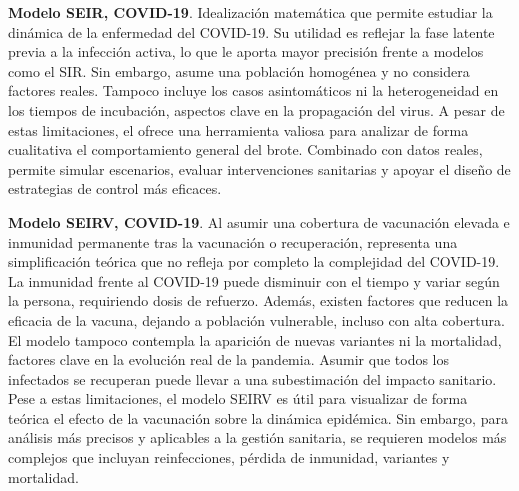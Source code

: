 \vspace{2em}
\textbf{Modelo SEIR, COVID-19}. Idealización matemática que permite estudiar la dinámica de la enfermedad del COVID-19. Su utilidad es reflejar la fase latente previa a la infección activa, lo que le aporta mayor precisión frente a modelos como el SIR.
Sin embargo, asume una población homogénea y no considera factores reales. Tampoco incluye los casos asintomáticos ni la heterogeneidad en los tiempos de incubación, aspectos clave en la propagación del virus.
A pesar de estas limitaciones, el ofrece una herramienta valiosa para analizar de forma cualitativa el comportamiento general del brote. Combinado con datos reales, permite simular escenarios, evaluar intervenciones sanitarias y apoyar el diseño de estrategias de control más eficaces.

\vspace{2em}

\textbf{Modelo SEIRV, COVID-19}. Al asumir una cobertura de vacunación elevada e inmunidad permanente tras la vacunación o recuperación, representa una simplificación teórica que no refleja por completo la complejidad del COVID-19.
La inmunidad frente al COVID-19 puede disminuir con el tiempo y variar según la persona, requiriendo dosis de refuerzo. Además, existen factores que reducen la eficacia de la vacuna, dejando a población vulnerable, incluso con alta cobertura.
El modelo tampoco contempla la aparición de nuevas variantes ni la mortalidad, factores clave en la evolución real de la pandemia. Asumir que todos los infectados se recuperan puede llevar a una subestimación del impacto sanitario.
Pese a estas limitaciones, el modelo SEIRV es útil para visualizar de forma teórica el efecto de la vacunación sobre la dinámica epidémica. Sin embargo, para análisis más precisos y aplicables a la gestión sanitaria, se requieren modelos más complejos que incluyan reinfecciones, pérdida de inmunidad, variantes y mortalidad.